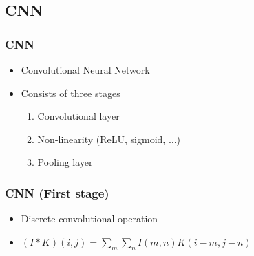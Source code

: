  \subsection{CNN}
  \begin{frame}
   \frametitle{CNN}
   
   \begin{itemize}
    \item<1-> Convolutional Neural Network
    \item<2-> Consists of three stages
    \begin{enumerate}
     \item<3-> Convolutional layer
     \item<4-> Non-linearity (ReLU, sigmoid, $\ldots$)
     \item<5-> Pooling layer
    \end{enumerate}
   \end{itemize}

  \end{frame}
  \begin{frame}
   \frametitle{CNN (First stage)}
   
   \begin{itemize}
    \item<1-> Discrete convolutional operation
    \item<2-> $(I \ast K)(i,j) = \sum_m\sum_nI(m,n)K(i-m,j-n)$
   \end{itemize}
   
  \end{frame}
